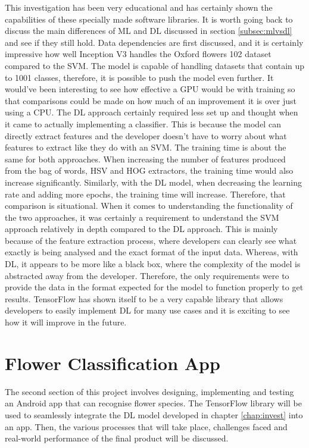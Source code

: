 \documentclass[12pt,a4paper]{report}
\begin{document}
This investigation has been very educational and has certainly shown the capabilities of these specially made software 
libraries. It is worth going back to discuss the main differences of ML and DL discussed in section \ref{subsec:mlvsdl}
and see if they 
still hold. Data dependencies are first discussed, and it is certainly impressive how well Inception V3 handles the 
Oxford flowers 102 dataset compared to the SVM. The model is capable of handling datasets that contain up to 1001 
classes, therefore, it is possible to push the model even further. It would've been interesting to see how effective a 
GPU would be with training so that comparisons could be made on how much of an improvement it is over just using a CPU. 
The DL approach certainly required less set up and thought when it came to actually implementing a classifier. This is 
because the model can directly extract features and the developer doesn't have to worry about what features to extract 
like they do with an SVM. The training time is about the same for both approaches. When increasing the number of 
features produced from the bag of words, HSV and HOG extractors, the training time would also increase significantly. 
Similarly, with the DL model, when decreasing the learning rate and adding more epochs, the training time will increase.
Therefore, that comparison is situational. When it comes to understanding the functionality of the two approaches, it 
was certainly a requirement to understand the SVM approach relatively in depth compared to the DL approach. This is 
mainly because of the feature extraction process, where developers can clearly see what exactly is being analysed and 
the exact format of the input data. Whereas, with DL, it appears to be more like a black box, where the complexity of 
the model is abstracted away from the developer. Therefore, the only requirements were to provide the data in the format
expected for the model to function properly to get results. TensorFlow has shown itself to be a 
very capable library that allows developers to easily implement DL for many use cases and it is exciting to see
how it will improve in the future. 


\clearpage

\chapter{Flower Classification App}

The second section of this project involves designing, implementing and testing an Android app that can recognise flower
species. The TensorFlow library will be used to seamlessly integrate the DL model developed in chapter
\ref{chap:invest} into an app. Then, the various processes that will take place, challenges faced and real-world 
performance of the final product will be discussed.
\end{document}

